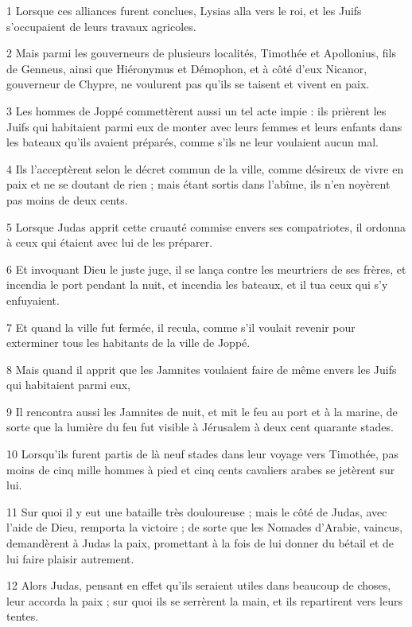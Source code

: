 \par 1 Lorsque ces alliances furent conclues, Lysias alla vers le roi, et les Juifs s'occupaient de leurs travaux agricoles.
\par 2 Mais parmi les gouverneurs de plusieurs localités, Timothée et Apollonius, fils de Genneus, ainsi que Hiéronymus et Démophon, et à côté d'eux Nicanor, gouverneur de Chypre, ne voulurent pas qu'ils se taisent et vivent en paix.
\par 3 Les hommes de Joppé commettèrent aussi un tel acte impie : ils prièrent les Juifs qui habitaient parmi eux de monter avec leurs femmes et leurs enfants dans les bateaux qu'ils avaient préparés, comme s'ils ne leur voulaient aucun mal.
\par 4 Ils l'acceptèrent selon le décret commun de la ville, comme désireux de vivre en paix et ne se doutant de rien ; mais étant sortis dans l'abîme, ils n'en noyèrent pas moins de deux cents.
\par 5 Lorsque Judas apprit cette cruauté commise envers ses compatriotes, il ordonna à ceux qui étaient avec lui de les préparer.
\par 6 Et invoquant Dieu le juste juge, il se lança contre les meurtriers de ses frères, et incendia le port pendant la nuit, et incendia les bateaux, et il tua ceux qui s'y enfuyaient.
\par 7 Et quand la ville fut fermée, il recula, comme s'il voulait revenir pour exterminer tous les habitants de la ville de Joppé.
\par 8 Mais quand il apprit que les Jamnites voulaient faire de même envers les Juifs qui habitaient parmi eux,
\par 9 Il rencontra aussi les Jamnites de nuit, et mit le feu au port et à la marine, de sorte que la lumière du feu fut visible à Jérusalem à deux cent quarante stades.
\par 10 Lorsqu'ils furent partis de là neuf stades dans leur voyage vers Timothée, pas moins de cinq mille hommes à pied et cinq cents cavaliers arabes se jetèrent sur lui.
\par 11 Sur quoi il y eut une bataille très douloureuse ; mais le côté de Judas, avec l'aide de Dieu, remporta la victoire ; de sorte que les Nomades d'Arabie, vaincus, demandèrent à Judas la paix, promettant à la fois de lui donner du bétail et de lui faire plaisir autrement.
\par 12 Alors Judas, pensant en effet qu'ils seraient utiles dans beaucoup de choses, leur accorda la paix ; sur quoi ils se serrèrent la main, et ils repartirent vers leurs tentes.
